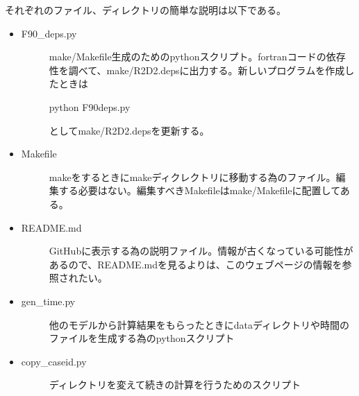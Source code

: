 \documentclass[letterpaper,10pt,dvipdfmx,report]{sphinxmanual}
\begin{document}
それぞれのファイル、ディレクトリの簡単な説明は以下である。
\begin{itemize}
\item {} \begin{description}
\item[{F90\_deps.py}] \leavevmode
make/Makefile生成のためのpythonスクリプト。fortranコードの依存性を調べて、make/R2D2.depsに出力する。新しいプログラムを作成したときは

\begin{sphinxVerbatim}[commandchars=\\\{\}]
python F90\PYGZus{}deps.py
\end{sphinxVerbatim}

としてmake/R2D2.depsを更新する。

\end{description}

\item {} \begin{description}
\item[{Makefile}] \leavevmode
makeをするときにmakeディクレクトリに移動する為のファイル。編集する必要はない。編集すべきMakefileはmake/Makefileに配置してある。

\end{description}

\item {} \begin{description}
\item[{README.md}] \leavevmode
GitHubに表示する為の説明ファイル。情報が古くなっている可能性があるので、README.mdを見るよりは、このウェブページの情報を参照されたい。

\end{description}

\item {} \begin{description}
\item[{gen\_time.py}] \leavevmode
他のモデルから計算結果をもらったときにdataディレクトリや時間のファイルを生成する為のpythonスクリプト

\end{description}

\item {} \begin{description}
\item[{copy\_caseid.py}] \leavevmode
ディレクトリを変えて続きの計算を行うためのスクリプト

\end{description}


\end{itemize}
\end{document}
